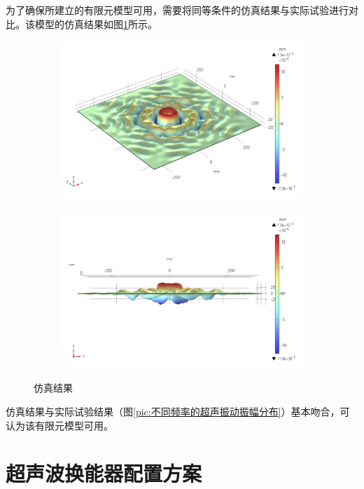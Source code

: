 \documentclass[fontset=windows,12pt,a4paper,titlepage,UTF8]{ctexart}
\begin{document}
为了确保所建立的有限元模型可用，需要将同等条件的仿真结果与实际试验进行对比。该模型的仿真结果如图\ref{pic:仿真结果}所示。

\begin{figure}[h]
  \centering
  \begin{subfigure}{0.45\textwidth}
    \includegraphics[width=\textwidth]{assets/result_600x600_proper_focus.png}
  \end{subfigure}
  \hfill
  \begin{subfigure}{0.45\textwidth}
    \includegraphics[width=\textwidth]{assets/result_600x600_side_focus.png}
  \end{subfigure}
  \caption{仿真结果}
  \label{pic:仿真结果}
\end{figure}

仿真结果与实际试验结果（图\ref{pic:不同频率的超声振动振幅分布}）基本吻合，可认为该有限元模型可用。

\section{超声波换能器配置方案}
\end{document}
